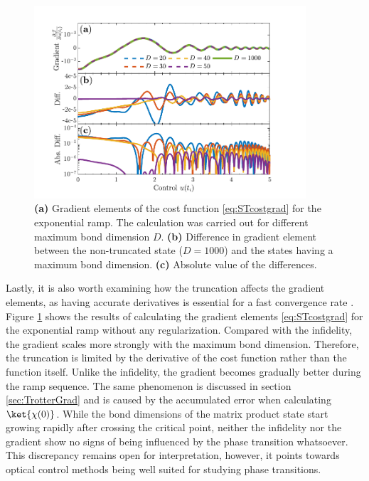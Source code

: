 \begin{figure}[h!]
    \centering
    \includegraphics[width=0.9\textwidth]{Figures/L20/GradientTruncation.pdf}
    \caption{ \textbf{(a)} Gradient elements of the cost function \ref{eq:STcostgrad} for the exponential ramp. The calculation was carried out for different maximum bond dimension $D$. \textbf{(b)} Difference in gradient element between the non-truncated state ($D = 1000$) and the states having a maximum bond dimension. \textbf{(c)} Absolute value of the differences. }
    \label{fig:GradientTruncation}
\end{figure}
Lastly, it is also worth examining how the truncation affects the gradient elements, as having accurate derivatives is essential for a fast convergence rate \cite{deFouquieres2011}. Figure \ref{fig:GradientTruncation} shows the results of calculating the gradient elements \ref{eq:STcostgrad} for the exponential ramp without any regularization. Compared with the infidelity, the gradient scales more strongly with the maximum bond dimension. Therefore, the truncation is limited by the derivative of the cost function rather than the function itself. Unlike the infidelity, the gradient becomes gradually better during the ramp sequence. The same phenomenon is discussed in section \ref{sec:TrotterGrad} and is caused by the accumulated error when calculating $\ket{\chi (0)}$. 
While the bond dimensions of the matrix product state start growing rapidly after crossing the critical point, neither the infidelity nor the gradient show no signs of being influenced by the phase transition whatsoever. This discrepancy remains open for interpretation, however, it points towards optical control methods being well suited for studying phase transitions. 